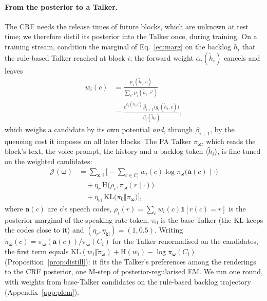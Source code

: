 \paragraph{From the posterior to a Talker.} The CRF needs the release times of future blocks, which are unknown at
test time; we therefore distil its posterior into the Talker once, during training. On a training stream, condition the
marginal of Eq.~\eqref{eq:marg} on the backlog $\tilde{h}_i$ that the rule-based Talker reached at block $i$; the
forward weight $\alpha_i(\tilde{h}_i)$ cancels and leaves
\begin{equation}
\begin{aligned}
w_i(c)&=\frac{\mu_i(\tilde{h}_i,c)}{\sum_{c'}\mu_i(\tilde{h}_i,c')}\\
&=\frac{e^{\phi_i(\tilde{h}_i,c)}\,\beta_{i+1}\big(g_i(\tilde{h}_i,c)\big)}{\beta_i(\tilde{h}_i)},
\end{aligned}
\label{eq:w}
\end{equation}
which weighs a candidate by its own potential \emph{and}, through $\beta_{i+1}$, by the queueing cost it imposes on all
later blocks. The PA Talker $\pi_{\bm{\omega}}$, which reads the block's text, the voice prompt, the history and a
backlog token $\langle\tilde{h}_i\rangle$, is fine-tuned on the weighted candidates:
\begin{equation}
\begin{aligned}
\mathcal{J}(\bm{\omega})&=\textstyle\sum_{\bm{x},i}\Big[-\sum_{c\in C_i}w_i(c)\log\pi_{\bm{\omega}}\big(\bm{a}(c)\mid\cdot\big)\\
&\quad+\eta_r\,\mathrm{H}\big(\rho_i,\pi_{\bm{\omega}}(r\mid\cdot)\big)\\
&\quad+\eta_\text{kl}\,\mathrm{KL}\big(\pi_0\Vert\pi_{\bm{\omega}}\big)\Big],
\end{aligned}
\label{eq:distill}
\end{equation}
where $\bm{a}(c)$ are $c$'s speech codes, $\rho_i(r)=\sum_cw_i(c)\mathds{1}[r(c)=r]$ is the posterior marginal of the
speaking-rate token, $\pi_0$ is the base Talker (the KL keeps the codes close to it) and $(\eta_r,\eta_\text{kl})=(1,0.5)$.
Writing $\tilde{\pi}_{\bm{\omega}}(c)=\pi_{\bm{\omega}}(\bm{a}(c))/\pi_{\bm{\omega}}(C_i)$ for the Talker renormalised on
the candidates, the first term equals $\mathrm{KL}(w_i\Vert\tilde{\pi}_{\bm{\omega}})+\mathrm{H}(w_i)-\log\pi_{\bm{\omega}}(C_i)$
(Proposition~\ref{prop:distill}): it fits the Talker's preferences among the renderings to the CRF posterior, one
M-step of posterior-regularised EM. We run one round, with weights from base-Talker candidates on the rule-based
backlog trajectory (Appendix~\ref{app:plem}).


